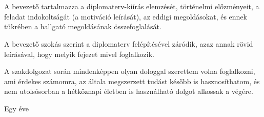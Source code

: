 \chapter{\bevezetes}

A bevezető tartalmazza a diplomaterv-kiírás elemzését, történelmi előzményeit, a feladat indokoltságát (a motiváció leírását), az eddigi megoldásokat, és ennek tükrében a hallgató megoldásának összefoglalását.

A bevezető szokás szerint a diplomaterv felépítésével záródik, azaz annak rövid leírásával, hogy melyik fejezet mivel foglalkozik.


A szakdolgozat során mindenképpen olyan dologgal szerettem volna foglalkozni, ami érdekes számomra, az általa megszerzett tudást később is hasznosíthatom, és nem utolsósorban a hétköznapi életben is használható dolgot alkossak a végére. 

Egy éve  
